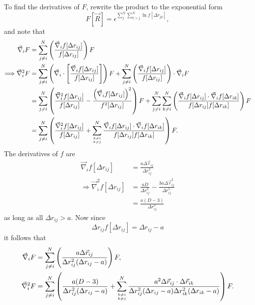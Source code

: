 \documentclass[a4paper,8pt]{article}
\begin{document}
To find the derivatives of $F$, rewrite the product to the exponential form 
\begin{equation}
F[\vec{R}] = \epsilon^{\sum\limits_{j}^N\sum\limits_{k > j}^N \ln f[\Delta{r}_{jk}]},
\end{equation}
and note that
\begin{align}
\vec{\nabla}_i F &= \sum\limits_{j \neq i}^N \left(\frac{\vec{\nabla}_i f[\Delta{r}_{ij}]}{f[\Delta{r}_{ij}]}\right) F \\
\Longrightarrow \vec{\nabla}_i^2 F &= \sum\limits_{j \neq i}^N \left(\vec{\nabla}_i\cdot\left[\frac{\vec{\nabla}_i f[\Delta{r}_{ij}]}{f[\Delta{r}_{ij}]}\right]\right) F + \sum\limits_{j \neq i}^N \left(\frac{\vec{\nabla}_i f[\Delta{r}_{ij}]}{f[\Delta{r}_{ij}]}\right)\cdot \vec{\nabla}_i F \nonumber\\
&= \sum\limits_{j \neq i}^N \left(\frac{\vec{\nabla}_i^2 f[\Delta{r}_{ij}]}{f[\Delta{r}_{ij}]} - \frac{\left(\vec{\nabla}_i f[\Delta{r}_{ij}]\right)^2}{f^2[\Delta{r}_{ij}]}\right) F + \sum\limits_{j \neq i}^N \sum\limits_{k \neq i}^N \left(\frac{\vec{\nabla}_i f[\Delta{r}_{ij}] \cdot\vec{\nabla}_i f[\Delta{r}_{ik}]}{f[\Delta{r}_{ij}]f[\Delta{r}_{ik}]}\right) F \nonumber\\
&= \sum\limits_{j \neq i}^N \left(\frac{\vec{\nabla}_i^2 f[\Delta{r}_{ij}]}{f[\Delta{r}_{ij}]} + \sum\limits_{{k \neq i}\atop{k \neq j}}^N \frac{\vec{\nabla}_i f[\Delta{r}_{ij}] \cdot\vec{\nabla}_i f[\Delta{r}_{ik}]}{f[\Delta{r}_{ij}]f[\Delta{r}_{ik}]}\right) F.
\end{align}
The derivatives of $f$ are
\begin{align}
\vec{\nabla}_i f[\Delta{r}_{ij}] &= \frac{a\Delta\vec{r}_{ij}}{\Delta{r}_{ij}^3} \\
\Longrightarrow \vec{\nabla}_i^2 f[\Delta{r}_{ij}] &= \frac{aD}{\Delta{r}_{ij}^3}-\frac{3a\Delta\vec{r}_{ij}^2}{\Delta{r}_{ij}^5} \nonumber\\
&= \frac{a(D-3)}{\Delta{r}_{ij}^3}
\end{align}
as long as all $\Delta{r}_{ij} > a$. Now since
\begin{equation}
\Delta{r}_{ij} f[\Delta{r}_{ij}] = \Delta{r}_{ij}-a
\end{equation}
it follows that
\begin{align}
\vec{\nabla}_i F &= \sum\limits_{j \neq i}^N \left(\frac{a\Delta\vec{r}_{ij}}{\Delta{r}_{ij}^2(\Delta{r}_{ij}-a)}\right) F, \label{grad_F}\\
\vec{\nabla}_i^2 F &= \sum\limits_{j \neq i}^N \left(\frac{a(D-3)}{\Delta{r}_{ij}^2(\Delta{r}_{ij}-a)} + \sum\limits_{{k \neq i}\atop{k \neq j}}^N \frac{a^2 \Delta\vec{r}_{ij} \cdot \Delta\vec{r}_{ik}}{\Delta{r}_{ij}^2(\Delta{r}_{ij}-a) \Delta{r}_{ik}^2(\Delta{r}_{ik}-a)}\right) F. \label{Lap_F}
\end{align}
\end{document}
